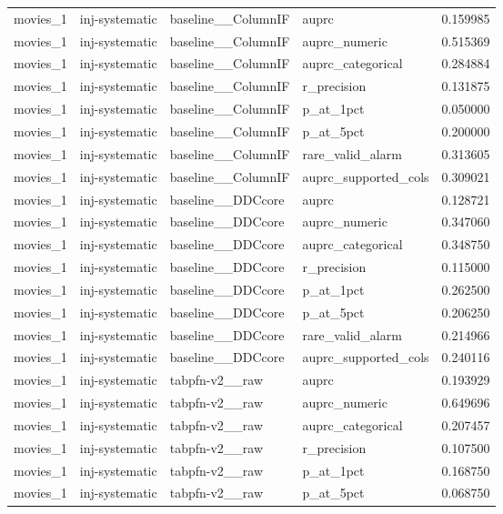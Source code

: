 \begin{tabular}{lllll}
movies\_1 & inj-systematic & baseline\_\_ColumnIF & auprc & 0.159985 \\
movies\_1 & inj-systematic & baseline\_\_ColumnIF & auprc\_numeric & 0.515369 \\
movies\_1 & inj-systematic & baseline\_\_ColumnIF & auprc\_categorical & 0.284884 \\
movies\_1 & inj-systematic & baseline\_\_ColumnIF & r\_precision & 0.131875 \\
movies\_1 & inj-systematic & baseline\_\_ColumnIF & p\_at\_1pct & 0.050000 \\
movies\_1 & inj-systematic & baseline\_\_ColumnIF & p\_at\_5pct & 0.200000 \\
movies\_1 & inj-systematic & baseline\_\_ColumnIF & rare\_valid\_alarm & 0.313605 \\
movies\_1 & inj-systematic & baseline\_\_ColumnIF & auprc\_supported\_cols & 0.309021 \\
movies\_1 & inj-systematic & baseline\_\_DDCcore & auprc & 0.128721 \\
movies\_1 & inj-systematic & baseline\_\_DDCcore & auprc\_numeric & 0.347060 \\
movies\_1 & inj-systematic & baseline\_\_DDCcore & auprc\_categorical & 0.348750 \\
movies\_1 & inj-systematic & baseline\_\_DDCcore & r\_precision & 0.115000 \\
movies\_1 & inj-systematic & baseline\_\_DDCcore & p\_at\_1pct & 0.262500 \\
movies\_1 & inj-systematic & baseline\_\_DDCcore & p\_at\_5pct & 0.206250 \\
movies\_1 & inj-systematic & baseline\_\_DDCcore & rare\_valid\_alarm & 0.214966 \\
movies\_1 & inj-systematic & baseline\_\_DDCcore & auprc\_supported\_cols & 0.240116 \\
movies\_1 & inj-systematic & tabpfn-v2\_\_raw & auprc & 0.193929 \\
movies\_1 & inj-systematic & tabpfn-v2\_\_raw & auprc\_numeric & 0.649696 \\
movies\_1 & inj-systematic & tabpfn-v2\_\_raw & auprc\_categorical & 0.207457 \\
movies\_1 & inj-systematic & tabpfn-v2\_\_raw & r\_precision & 0.107500 \\
movies\_1 & inj-systematic & tabpfn-v2\_\_raw & p\_at\_1pct & 0.168750 \\
movies\_1 & inj-systematic & tabpfn-v2\_\_raw & p\_at\_5pct & 0.068750 \\

\end{tabular}

